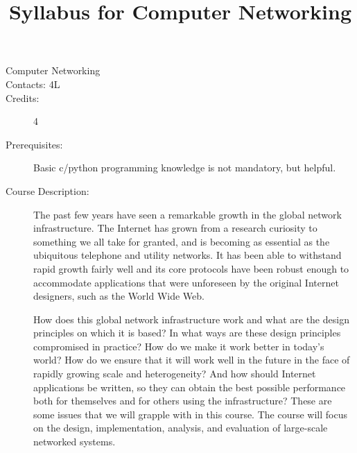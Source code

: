 \documentclass{wx672article} %
\title{Syllabus for Computer Networking}
\author{}\date{}
\begin{document}

\begin{description}
\item[Computer Networking]
\item[Contacts: 4L]
\item[Credits:] 4
\item[Prerequisites:] Basic c/python programming knowledge is not mandatory, but helpful.
\item[Course Description:] The past few years have seen a remarkable growth in the global
  network infrastructure. The Internet has grown from a research curiosity to something we
  all take for granted, and is becoming as essential as the ubiquitous telephone and
  utility networks. It has been able to withstand rapid growth fairly well and its core
  protocols have been robust enough to accommodate applications that were unforeseen by
  the original Internet designers, such as the World Wide Web.

  How does this global network infrastructure work and what are the design principles on
  which it is based? In what ways are these design principles compromised in practice? How
  do we make it work better in today's world? How do we ensure that it will work well in
  the future in the face of rapidly growing scale and heterogeneity? And how should
  Internet applications be written, so they can obtain the best possible performance both
  for themselves and for others using the infrastructure? These are some issues that we
  will grapple with in this course. The course will focus on the design, implementation,
  analysis, and evaluation of large-scale networked systems.


\end{description}
\end{document}
